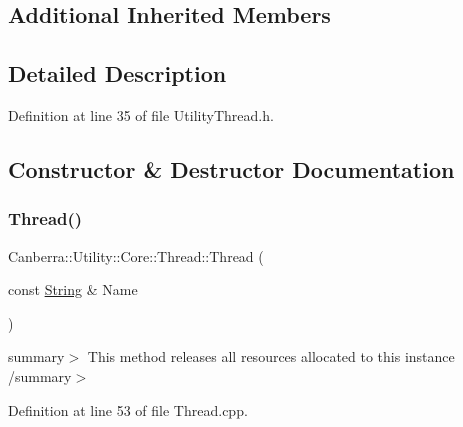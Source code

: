 \subsection*{Additional Inherited Members}


\subsection{Detailed Description}


Definition at line 35 of file Utility\+Thread.\+h.



\subsection{Constructor \& Destructor Documentation}
\mbox{\label{class_canberra_1_1_utility_1_1_core_1_1_thread_accf3a0d8c1bbcc5d2fb21bfacd0e0c5b_accf3a0d8c1bbcc5d2fb21bfacd0e0c5b}} 
\subsubsection{\texorpdfstring{Thread()}{Thread()}}
{\footnotesize\ttfamily Canberra\+::\+Utility\+::\+Core\+::\+Thread\+::\+Thread (\begin{DoxyParamCaption}\item[{const \hyperlink{class_canberra_1_1_utility_1_1_core_1_1_string}{String} \&}]{Name }\end{DoxyParamCaption})}

summary$>$ This method releases all resources allocated to this instance /summary$>$ 

Definition at line 53 of file Thread.\+cpp.

\mbox{\label{class_canberra_1_1_utility_1_1_core_1_1_thread_a0091317792eeb41b17f935d9c53ca92d_a0091317792eeb41b17f935d9c53ca92d}} 
